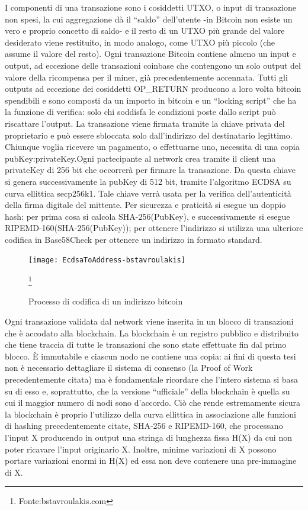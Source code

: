 I componenti di una transazione sono i cosiddetti UTXO, o input di transazione non spesi, la cui aggregazione dà il “saldo” dell’utente -in Bitcoin non esiste un vero e proprio concetto di saldo- e il resto di un UTXO più grande del valore desiderato viene restituito, in modo analogo, come UTXO più piccolo (che assume il valore del resto). 
Ogni transazione Bitcoin contiene almeno un input e output, ad eccezione delle transazioni coinbase che contengono un solo output del valore della ricompensa per il miner, già precedentemente accennata. Tutti gli outputs ad eccezione dei cosiddetti OP\_RETURN producono a loro volta bitcoin spendibili e sono composti da un importo in bitcoin e un “locking script” che ha la funzione di verifica: solo chi soddisfa le condizioni poste dallo script può riscattare l’output. La transazione viene firmata tramite la chiave privata del proprietario e può essere sbloccata solo dall’indirizzo del destinatario legittimo.
Chiunque voglia ricevere un pagamento, o effettuarne uno, necessita di una copia pubKey:privateKey.Ogni partecipante al network crea tramite il client una privateKey di 256 bit che occorrerà per firmare la transazione.
Da questa chiave si genera successivamente la pubKey di 512 bit, tramite l’algoritmo ECDSA su curva ellittica secp256k1.
Tale chiave verrà usata per la verifica dell'autenticità della firma digitale del mittente.  
Per sicurezza e praticità si esegue un doppio hash: per prima cosa si calcola SHA-256(PubKey), e successivamente si esegue RIPEMD-160(SHA-256(PubKey)); per ottenere l'indirizzo si utilizza una ulteriore codifica in Base58Check per ottenere un indirizzo in formato standard.


\begin{figure}[h!]
\centering
\texttt{[image: EcdsaToAddress-bstavroulakis]}
\caption{Processo di codifica di un indirizzo bitcoin}
\label{fig:ecdsatoaddress-bstavroulakis}
\footnote{Fonte:bstavroulakis.com}
\end{figure}


Ogni transazione validata dal network viene inserita in un blocco di transazioni che è accodato alla blockchain.
La blockchain è un registro pubblico e distribuito che tiene traccia di tutte le transazioni che sono state effettuate fin dal primo blocco. È immutabile e ciascun nodo ne contiene una copia: ai fini di questa tesi non è necessario dettagliare il sistema di consenso (la Proof of Work precedentemente citata) ma è fondamentale ricordare che l’intero sistema si basa su di esso e, soprattutto, che la versione “ufficiale” della blockchain è quella su cui il maggior numero di nodi sono d’accordo. Ciò che rende estremamente sicura la blockchain è proprio l’utilizzo della curva ellittica in associazione alle funzioni di hashing precedentemente citate, SHA-256 e RIPEMD-160, che processano l’input X producendo in output una stringa di lunghezza fissa H(X) da cui non poter ricavare l’input originario X. Inoltre, minime variazioni di X possono portare variazioni enormi in H(X) ed essa non deve contenere una pre-immagine di X.

